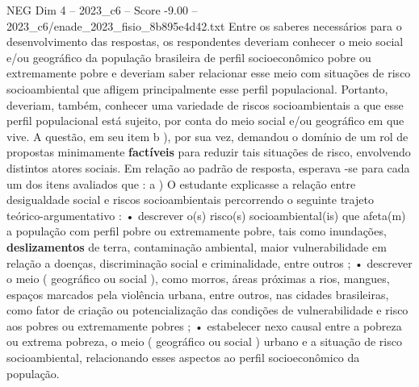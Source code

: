\begin{textsample}{NEG Dim 4 – 2023\_c6 – Score -9.00 – 2023\_c6/enade\_2023\_fisio\_8b895e4d42.txt}
Entre os saberes necessários para o desenvolvimento das respostas, os respondentes deveriam conhecer o meio social e/ou geográfico da população brasileira de perfil socioeconômico pobre ou extremamente pobre e deveriam saber relacionar esse meio com situações de risco socioambiental que afligem principalmente esse perfil populacional.
Portanto, deveriam, também, conhecer uma variedade de riscos socioambientais a que esse perfil populacional está sujeito, por conta do meio social e/ou geográfico em que vive.
A questão, em seu item b ), por sua vez, demandou o domínio de um rol de propostas minimamente \textbf{factíveis} para reduzir tais situações de risco, envolvendo distintos atores sociais.
Em relação ao padrão de resposta, esperava -se para cada um dos itens avaliados que : a ) O estudante explicasse a relação entre desigualdade social e riscos socioambientais percorrendo o seguinte trajeto teórico-argumentativo : • descrever o(s) risco(s) socioambiental(is) que afeta(m) a população com perfil pobre ou extremamente pobre, tais como inundações, \textbf{deslizamentos} de terra, contaminação ambiental, maior vulnerabilidade em relação a doenças, discriminação social e criminalidade, entre outros ; • descrever o meio ( geográfico ou social ), como morros, áreas próximas a rios, mangues, espaços marcados pela violência urbana, entre outros, nas cidades brasileiras, como fator de criação ou potencialização das condições de vulnerabilidade e risco aos pobres ou extremamente pobres ; • estabelecer nexo causal entre a pobreza ou extrema pobreza, o meio ( geográfico ou social ) urbano e a situação de risco socioambiental, relacionando esses aspectos ao perfil socioeconômico da população.

\end{textsample}
